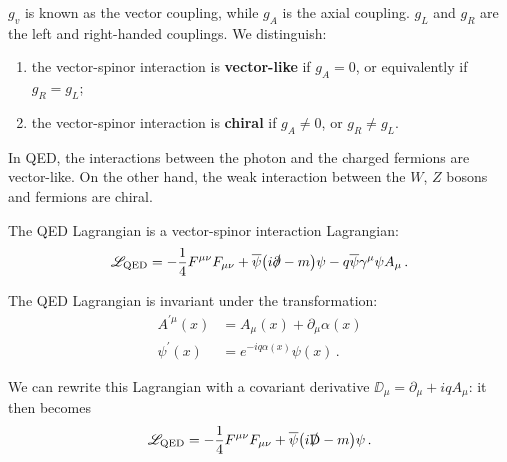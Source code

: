 \documentclass[main.tex]{subfiles}
\begin{document}
\(g_v\) is known as the vector coupling, while \(g_A\) is the axial coupling. \(g_L\) and \(g_R\) are the left and right-handed couplings. We distinguish:
\begin{enumerate}
    \item the vector-spinor interaction is \textbf{vector-like} if \(g_A = 0\), or equivalently if \(g_R = g_L\);
    \item the vector-spinor interaction is \textbf{chiral} if \(g_A \neq 0\), or \(g_R \neq g_L\).
\end{enumerate}

In QED, the interactions between the photon and the charged fermions are vector-like. 
On the other hand, the weak interaction between the \(W\), \(Z\) bosons and fermions are chiral. 

The QED Lagrangian is a vector-spinor interaction Lagrangian:
%
\begin{align}
\mathscr{L} _{\text{QED}} = - \frac{1}{4} F^{\mu \nu } F_{\mu \nu }
+ \overline{\psi} \qty(i \slashed{\partial} - m) \psi 
- q \overline{\psi} \gamma^{\mu } \psi A_{\mu } 
\,.
\end{align}

\begin{claim}
The QED Lagrangian is invariant under the transformation: 
%
\begin{subequations}
\begin{align}
A^{\prime \mu } (x)  &= A_{\mu } (x) + \partial_{\mu } \alpha (x)  \\
\psi^{\prime }(x) &= e^{-iq \alpha (x)} \psi (x)
\,.
\end{align}
\end{subequations}

We can rewrite this Lagrangian with a covariant derivative \(\DD_{\mu } = \partial_{\mu } + i q A_{\mu }\): it then becomes 
%
\begin{align}
\mathscr{L} _{\text{QED}} = - \frac{1}{4} F^{\mu \nu } F_{\mu \nu }
+ \overline{\psi} \qty(i \slashed{\mathrm{D}} - m) \psi 
\,.
\end{align}
\end{claim}
\end{document}

